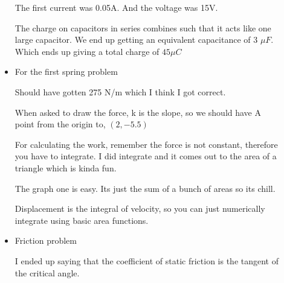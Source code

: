 \documentclass{report}
\begin{document}
\begin{description}
\begin{mdframed}
\begin{itemize}
\begin{mdframed}
                        The first current was 0.05A. And the voltage
                        was 15V.
                    \end{mdframed}
                    \begin{mdframed}
                        The charge on capacitors in series combines such
                        that it acts like one large capacitor. We end
                        up getting an equivalent capacitance of 3 $\si{\mu F}$.
                        Which ends up giving a total charge of $45 \si{\mu C}$
                    \end{mdframed}
                \item For the first spring problem
                    \begin{mdframed}
                        Should have gotten 275 N/m which I think
                        I got correct.
                    \end{mdframed}
                    \begin{mdframed}
                        When asked to draw the force,
                        k is the slope, so we should have
                        A point from the origin to,
                        $(2, -5.5)$
                    \end{mdframed}
                    \begin{mdframed}
                        For calculating the work, remember the
                        force is not constant, therefore you have
                        to integrate. I did integrate and it
                        comes out to the area of a triangle which
                        is kinda fun.
                    \end{mdframed}
                    \begin{mdframed}
                        The graph one is easy. Its just the sum
                        of a bunch of areas so its chill.
                    \end{mdframed}
                    \begin{mdframed}
                        Displacement is the integral of velocity,
                        so you can just numerically integrate using
                        basic area functions.
                    \end{mdframed}
                \item Friction problem
                    \begin{mdframed}
                        I ended up saying that the coefficient of
                        static friction is the tangent of the
                        critical angle. 


\end{mdframed}
\end{itemize}
\end{mdframed}
\end{description}
\end{document}

